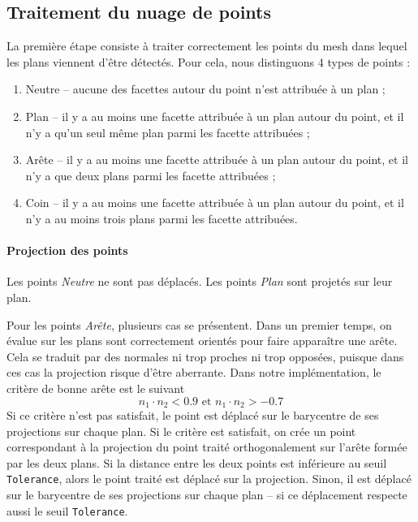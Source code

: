 ﻿\documentclass[12pt, twoside]{article}
\begin{document}
\subsection{Traitement du nuage de points}
La première étape consiste à traiter correctement les points du mesh dans lequel les plans viennent d'être détectés. Pour cela, nous distinguons 4 types de points :
\begin{enumerate}
  \item Neutre -- aucune des facettes autour du point n'est attribuée à un plan ;
  \item Plan -- il y a au moins une facette attribuée à un plan autour du point, et il n'y a qu'un seul même plan parmi les facette attribuées ;
  \item Arête -- il y a au moins une facette attribuée à un plan autour du point, et il n'y a que deux plans parmi les facette attribuées ;
  \item Coin -- il y a au moins une facette attribuée à un plan autour du point, et il n'y a au moins trois plans parmi les facette attribuées.
\end{enumerate}

\paragraph{Projection des points} Les points \textit{Neutre} ne sont pas déplacés. Les points \textit{Plan} sont projetés sur leur plan.

Pour les points \textit{Arête}, plusieurs cas se présentent. Dans un premier temps, on évalue sur les plans sont correctement orientés pour faire apparaître une arête. Cela se traduit par des normales ni trop proches ni trop opposées, puisque dans ces cas la projection risque d'être aberrante. Dans notre implémentation, le critère de bonne arête est le suivant
$$n_1\cdot n_2 < 0.9 \text{ et } n_1\cdot n_2 > -0.7$$
Si ce critère n'est pas satisfait, le point est déplacé sur le barycentre de ses projections sur chaque plan. Si le critère est satisfait, on crée un point correspondant à la projection du point traité orthogonalement sur l'arête formée par les deux plans. Si la distance entre les deux points est inférieure au seuil \texttt{Tolerance}, alors le point traité est déplacé sur la projection. Sinon, il est déplacé sur le barycentre de ses projections sur chaque plan -- si ce déplacement respecte aussi le seuil \texttt{Tolerance}.
\end{document}
